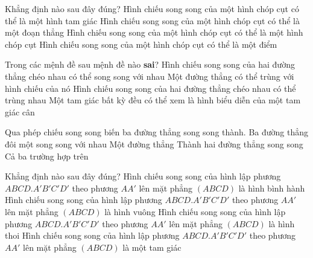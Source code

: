 \begin{ex}%
	Khẳng định nào sau đây đúng?
	\choice
	{\True Hình chiếu song song của một hình chóp cụt có thể là một hình tam giác}
	{Hình chiếu song song của một hình chóp cụt có thể là một đoạn thẳng}
	{Hình chiếu song song của một hình chóp cụt có thể là một hình chóp cụt}
	{Hình chiếu song song của một hình chóp cụt có thể là một điểm}
\end{ex}
\begin{ex}%
	Trong các mệnh đề sau mệnh đề nào \textbf{sai}?
	\choice
		{Hình chiếu song song của hai đường thẳng chéo nhau có thể song song với nhau}
		{Một đường thẳng có thể trùng với hình chiếu của nó}
		{\True Hình chiếu song song của hai đường thẳng chéo nhau có thể trùng nhau}
		{Một tam giác bất kỳ đều có thể xem là hình biểu diễn của một tam giác cân}
\end{ex}
\begin{ex}%
	Qua phép chiếu song song biến ba đường thẳng song song thành.
	\choice
		{Ba đường thẳng đôi một song song với nhau}
		{Một đường thẳng}
		{Thành hai đường thẳng song song}
		{\True Cả ba trường hợp trên}
\end{ex}
\begin{ex}%
	Khẳng định nào sau đây đúng?
	\choice
		{Hình chiếu song song của hình lập phương $ABCD.A'B'C'D'$ theo phương $AA'$ lên mặt phẳng $\left( ABCD \right)$ là hình bình hành}
		{\True Hình chiếu song song của hình lập phương $ABCD.A'B'C'D'$ theo phương $AA'$ lên mặt phẳng $\left( ABCD \right)$ là hình vuông}
		{Hình chiếu song song của hình lập phương $ABCD.A'B'C'D'$ theo phương $AA'$ lên mặt phẳng $\left( ABCD \right)$ là hình thoi}
		{Hình chiếu song song của hình lập phương $ABCD.A'B'C'D'$ theo phương $AA'$ lên mặt phẳng $\left( ABCD \right)$ là một tam giác}
\end{ex}
